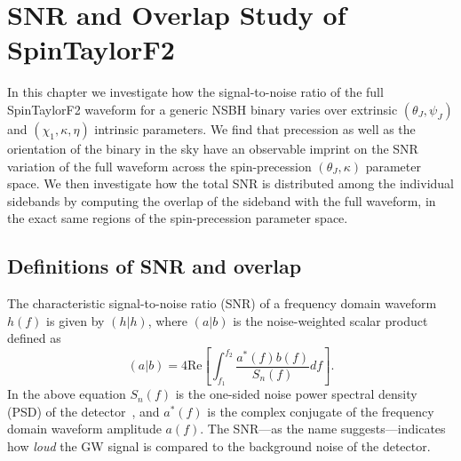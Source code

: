 
\chapter{SNR and Overlap Study of SpinTaylorF2}

In this chapter we investigate how the signal-to-noise ratio of the full
SpinTaylorF2 waveform for a generic NSBH binary varies over extrinsic $(\theta_J,
\psi_J)$ and $(\chi_1, \kappa, \eta)$ intrinsic parameters. We find that precession
as well as the orientation of the binary in the sky have an observable imprint 
on the SNR variation of the full waveform across the spin-precession $(\theta_J,
\kappa)$ parameter space. We then investigate how the total SNR is
distributed among the individual sidebands by computing the overlap of the
sideband with the full waveform, in the exact same regions of the 
spin-precession parameter space.

\section{Definitions of SNR and overlap}

The characteristic signal-to-noise ratio (SNR) of a frequency domain waveform
$h(f)$ is given by $(h|h)$, where $(a|b)$ is the noise-weighted scalar product
defined as
\label{inner_product}  
\begin{equation} (a|b) = 4 \text{Re} \left[
\int_{f_{1}}^{f_{2}}  \dfrac{a^{*}(f)b(f)}{S_{n}(f)} df\right].
\end{equation}
In the above equation $S_{n}(f)$ is the one-sided noise power spectral density
(PSD) of the detector~\cite{PSD}, and $a^{*}(f)$ is the complex conjugate of
the frequency domain waveform amplitude $a(f)$. The SNR---as the name
suggests---indicates how \textit{loud} the GW signal is compared to the
background noise of the detector. 

